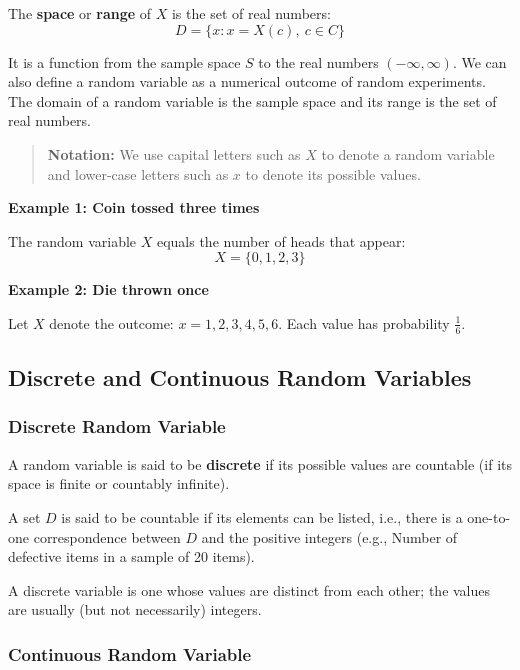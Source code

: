 \documentclass[
]{article}
\begin{document}
The \textbf{space} or \textbf{range} of \(X\) is the set of real
numbers: \[D = \{x : x = X(c),\ c \in C\}\]

It is a function from the sample space \(S\) to the real numbers
\((-\infty, \infty)\). We can also define a random variable as a
numerical outcome of random experiments. The domain of a random variable
is the sample space and its range is the set of real numbers.

\begin{quote}
\textbf{Notation:} We use capital letters such as \(X\) to denote a
random variable and lower-case letters such as \(x\) to denote its
possible values.
\end{quote}

\textbf{Example 1: Coin tossed three times}

The random variable \(X\) equals the number of heads that appear:
\[X = \{0, 1, 2, 3\}\]

\textbf{Example 2: Die thrown once}

Let \(X\) denote the outcome: \(x = 1, 2, 3, 4, 5, 6\). Each value has
probability \(\frac{1}{6}\).

\subsection{Discrete and Continuous Random
Variables}\label{discrete-and-continuous-random-variables}

\subsubsection{Discrete Random Variable}\label{discrete-random-variable}

A random variable is said to be \textbf{discrete} if its possible values
are countable (if its space is finite or countably infinite).

A set \(D\) is said to be countable if its elements can be listed, i.e.,
there is a one-to-one correspondence between \(D\) and the positive
integers (e.g., Number of defective items in a sample of 20 items).

A discrete variable is one whose values are distinct from each other;
the values are usually (but not necessarily) integers.

\subsubsection{Continuous Random
Variable}\label{continuous-random-variable}
\end{document}
